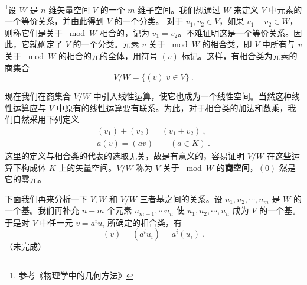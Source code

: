 
\begin{issues}
\issueDraft
\end{issues}



\footnote{参考《物理学中的几何方法》}设 $W$ 是 $n$ 维矢量空间 $V$ 的一个 $m$ 维子空间。我们想通过 $W$ 来定义 $V$ 中元素的一个等价关系，并由此得到 $V$ 的一个分类。
对于 $v_1,v_2\in V$，如果 $v_1-v_2\in W$，则称它们是关于 $\bmod W $ 相合的，记为 $v_1=v_2$。不难证明这是一个等价关系。因此，它就确定了 $V $ 的一个分类。元素 $v $ 关于 $\bmod W $ 的相合类，即 $V $ 中所有与 $v $ 关于 $\bmod W $ 的相合的元的全体，用符号 $(v) $ 标记。这样，有相合类为元素的商集合
\begin{equation}
V / W=\{(v) | v \in V\}~.
\end{equation}

现在我们在商集合 $V/W $ 中引入线性运算，使它也成为一个线性空间。当然这种线性运算应与 $V $ 中原有的线性运算要有联系。为此，对于相合类的加法和数乘，我们自然采用下列定义
\begin{equation}
\begin{array}{l}\left(v_{1}\right)+\left(v_{2}\right)=\left(v_{1}+v_{2}\right)~, \\ a(v)=(a v)\qquad (a \in K)~.
\end{array}
\end{equation}
这里的定义与相合类的代表的选取无关，故是有意义的，容易证明 $V/W $ 在这些运算下构成体 $K $ 上的矢量空间。$V/W $ 称为 $V $ 关于 $\bmod W$ 的\textbf{商空间}，$(0)$ 然是它的零元。

下面我们再来分析一下 $V,W$ 和 $V/W $ 三者基之间的关系。设 $u_1,u_2,\cdots,u_m$ 是 $W $ 的一个基。我们再补充 $n- m$ 个元素 ${u}_{m+1}, \cdots {u}_{n}$ 使 $u_{1}, u_{2}, \cdots, u_{n}$ 成为 $V$ 的一个基。于是对 $V $ 中任一元 $v=a^iu_i$ 所确定的相合类，有
\begin{equation}
(v)=\left(a^{i} u_{i}\right)=a^{i}\left(u_{i}\right)~.
\end{equation}
（未完成）
